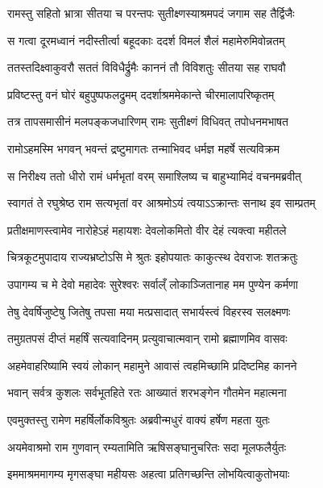 
\twolineshloka
{रामस्तु सहितो भ्रात्रा सीतया च परन्तपः}
{सुतीक्ष्णस्याश्रमपदं जगाम सह तैर्द्विजैः} %

\twolineshloka
{स गत्वा दूरमध्वानं नदीस्तीर्त्वा बहूदकाः}
{ददर्श विमलं शैलं महामेरुमिवोन्नतम्} %

\twolineshloka
{ततस्तदिक्ष्वाकुवरौ सततं विविधैर्द्रुमैः}
{काननं तौ विविशतुः सीतया सह राघवौ} %

\twolineshloka
{प्रविष्टस्तु वनं घोरं बहुपुष्पफलद्रुमम्}
{ददर्शाश्रममेकान्ते चीरमालापरिष्कृतम्} %

\twolineshloka
{तत्र तापसमासीनं मलपङ्कजधारिणम्}
{रामः सुतीक्ष्णं विधिवत् तपोधनमभाषत} %

\twolineshloka
{रामोऽहमस्मि भगवन् भवन्तं द्रष्टुमागतः}
{तन्माभिवद धर्मज्ञ महर्षे सत्यविक्रम} %

\twolineshloka
{स निरीक्ष्य ततो धीरो रामं धर्मभृतां वरम्}
{समाश्लिष्य च बाहुभ्यामिदं वचनमब्रवीत्} %

\twolineshloka
{स्वागतं ते रघुश्रेष्ठ राम सत्यभृतां वर}
{आश्रमोऽयं त्वयाऽऽक्रान्तः सनाथ इव साम्प्रतम्} %

\twolineshloka
{प्रतीक्षमाणस्त्वामेव नारोहेऽहं महायशः}
{देवलोकमितो वीर देहं त्यक्त्वा महीतले} %

\twolineshloka
{चित्रकूटमुपादाय राज्यभ्रष्टोऽसि मे श्रुतः}
{इहोपयातः काकुत्स्थ देवराजः शतक्रतुः} %

\twolineshloka
{उपागम्य च मे देवो महादेवः सुरेश्वरः}
{सर्वाल्ँ लोकाञ्जितानाह मम पुण्येन कर्मणा} %

\twolineshloka
{तेषु देवर्षिजुष्टेषु जितेषु तपसा मया}
{मत्प्रसादात् सभार्यस्त्वं विहरस्व सलक्ष्मणः} %

\twolineshloka
{तमुग्रतपसं दीप्तं महर्षिं सत्यवादिनम्}
{प्रत्युवाचात्मवान् रामो ब्रह्माणमिव वासवः} %

\twolineshloka
{अहमेवाहरिष्यामि स्वयं लोकान् महामुने}
{आवासं त्वहमिच्छामि प्रदिष्टमिह कानने} %

\twolineshloka
{भवान् सर्वत्र कुशलः सर्वभूतहिते रतः}
{आख्यातं शरभङ्गेन गौतमेन महात्मना} %

\twolineshloka
{एवमुक्तस्तु रामेण महर्षिर्लोकविश्रुतः}
{अब्रवीन्मधुरं वाक्यं हर्षेण महता युतः} %

\twolineshloka
{अयमेवाश्रमो राम गुणवान् रम्यतामिति}
{ऋषिसङ्घानुचरितः सदा मूलफलैर्युतः} %

\twolineshloka
{इममाश्रममागम्य मृगसङ्घा महीयसः}
{अहत्वा प्रतिगच्छन्ति लोभयित्वाकुतोभयाः} %

